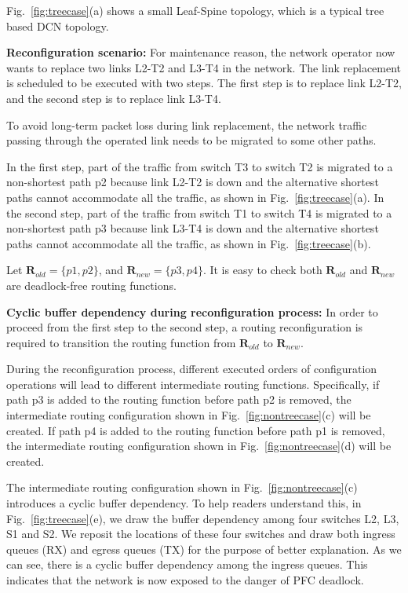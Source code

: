 Fig.~\ref{fig:treecase}(a) shows a small Leaf-Spine topology, which is a typical tree based DCN topology.

\textbf{Reconfiguration scenario:} For maintenance reason, the network operator now wants to replace two links L2-T2 and L3-T4 in the network. The link replacement is scheduled to be executed with two steps. The first step is to replace link L2-T2, and the second step is to replace link L3-T4.

To avoid long-term packet loss during link replacement, the network traffic passing through the operated link needs to be migrated to some other paths. 

In the first step, part of the traffic from switch T3 to switch T2 is migrated to a non-shortest path p2 because link L2-T2 is down and the alternative shortest paths cannot accommodate all the traffic, as shown in Fig.~\ref{fig:treecase}(a). In the second step, part of the traffic from switch T1 to switch T4 is migrated to a non-shortest path p3 because link L3-T4 is down and the alternative shortest paths cannot accommodate all the traffic, as shown in Fig.~\ref{fig:treecase}(b).

Let $\textbf{R}_{old} = \{p1, p2\}$, and $\textbf{R}_{new} = \{p3, p4\}$. It is easy to check both $\textbf{R}_{old}$ and $\textbf{R}_{new}$ are deadlock-free routing functions. 

\textbf{Cyclic buffer dependency during reconfiguration process:} In order to proceed from the first step to the second step, a routing reconfiguration is required to transition the routing function from $\textbf{R}_{old}$ to $\textbf{R}_{new}$.

During the reconfiguration process, different executed orders of configuration operations will lead to different intermediate routing functions. Specifically, if path p3 is added to the routing function before path p2 is removed, the intermediate routing configuration shown in Fig.~\ref{fig:nontreecase}(c) will be created. If path p4 is added to the routing function before path p1 is removed, the intermediate routing configuration shown in Fig.~\ref{fig:nontreecase}(d) will be created.  

The intermediate routing configuration shown in Fig.~\ref{fig:nontreecase}(c) introduces a cyclic buffer dependency.  To help readers understand this, in Fig.~\ref{fig:treecase}(e), we draw the buffer dependency among four switches L2, L3, S1 and S2. We reposit the locations of these four switches and draw both ingress queues (RX) and egress queues (TX) for the purpose of better explanation. As we can see, there is a cyclic buffer dependency among the ingress queues. This indicates that the network is now exposed to the danger of PFC deadlock.

